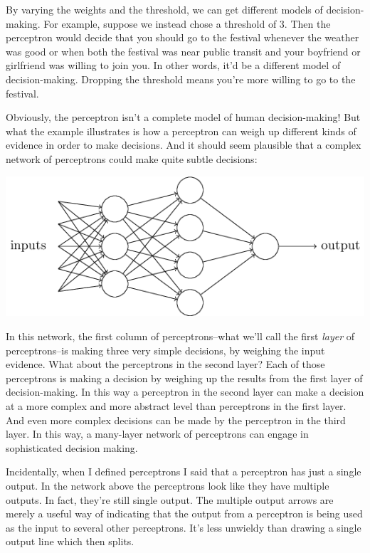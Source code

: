 \documentclass[a4paper,twoside,10pt]{book}
\begin{document}
By varying the weights and the threshold, we can get different models of decision-making. For example, suppose we instead chose a threshold of 3. Then the perceptron would decide that you should go to the festival whenever the weather was good or when both the festival was near public transit and your boyfriend or girlfriend was willing to join you. In other words, it'd be a different model of decision-making. Dropping the threshold means you're more willing to go to the festival.

Obviously, the perceptron isn't a complete model of human decision-making! But what the example illustrates is how a perceptron can weigh up different kinds of evidence in order to make decisions. And it should seem plausible that a complex network of perceptrons could make quite subtle decisions:
\begin{center}
	\includegraphics[scale=0.5]{./figures/ch1/tikz1}
\end{center}	

In this network, the first column of perceptrons--what we'll call the first \textit{layer} of perceptrons--is making three very simple decisions, by weighing the input evidence. What about the perceptrons in the second layer? Each of those perceptrons is making a decision by weighing up the results from the first layer of decision-making. In this way a perceptron in the second layer can make a decision at a more complex and more abstract level than perceptrons in the first layer. And even more complex decisions can be made by the perceptron in the third layer. In this way, a many-layer network of perceptrons can engage in sophisticated decision making.

Incidentally, when I defined perceptrons I said that a perceptron has just a single output. In the network above the perceptrons look like they have multiple outputs. In fact, they're still single output. The multiple output arrows are merely a useful way of indicating that the output from a perceptron is being used as the input to several other perceptrons. It's less unwieldy than drawing a single output line which then splits.
\end{document}
